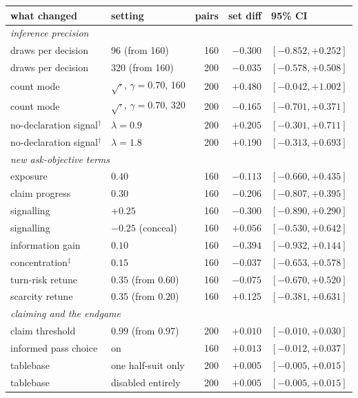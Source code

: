 \documentclass[11pt,letterpaper]{article}
\begin{document}
\begin{table}[t]
\centering
\small
\begin{tabular}{llrrl}
\toprule
what changed & setting & pairs & set diff & 95\% CI \\
\midrule
\multicolumn{5}{l}{\emph{inference precision}}\\
draws per decision & 96 (from 160) & 160 & $-0.300$ & $[-0.852, +0.252]$ \\
draws per decision & 320 (from 160) & 200 & $-0.035$ & $[-0.578, +0.508]$ \\
count mode & $\sqrt{\cdot}$, $\gamma{=}0.70$, 160 & 200 & $+0.480$ & $[-0.042, +1.002]$ \\
count mode & $\sqrt{\cdot}$, $\gamma{=}0.70$, 320 & 200 & $-0.165$ & $[-0.701, +0.371]$ \\
no-declaration signal$^\dagger$ & $\lambda = 0.9$ & 200 & $+0.205$ & $[-0.301, +0.711]$ \\
no-declaration signal$^\dagger$ & $\lambda = 1.8$ & 200 & $+0.190$ & $[-0.313, +0.693]$ \\
\midrule
\multicolumn{5}{l}{\emph{new ask-objective terms}}\\
exposure & $0.40$ & 160 & $-0.113$ & $[-0.660, +0.435]$ \\
claim progress & $0.30$ & 160 & $-0.206$ & $[-0.807, +0.395]$ \\
signalling & $+0.25$ & 160 & $-0.300$ & $[-0.890, +0.290]$ \\
signalling & $-0.25$ (conceal) & 160 & $+0.056$ & $[-0.530, +0.642]$ \\
information gain & $0.10$ & 160 & $-0.394$ & $[-0.932, +0.144]$ \\
concentration$^\ddagger$ & $0.15$ & 160 & $-0.037$ & $[-0.653, +0.578]$ \\
turn-risk retune & $0.35$ (from $0.60$) & 160 & $-0.075$ & $[-0.670, +0.520]$ \\
scarcity retune & $0.35$ (from $0.20$) & 160 & $+0.125$ & $[-0.381, +0.631]$ \\
\midrule
\multicolumn{5}{l}{\emph{claiming and the endgame}}\\
claim threshold & $0.99$ (from $0.97$) & 200 & $+0.010$ & $[-0.010, +0.030]$ \\
informed pass choice & on & 160 & $+0.013$ & $[-0.012, +0.037]$ \\
tablebase & one half-suit only & 200 & $+0.005$ & $[-0.005, +0.015]$ \\
tablebase & disabled entirely & 200 & $+0.005$ & $[-0.005, +0.015]$ \\

\end{tabular}
\end{table}
\end{document}
